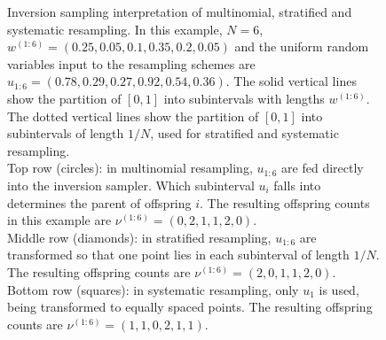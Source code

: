 \begin{figure}
\caption[Inversion sampling for multinomial, stratified and systematic resampling]{Inversion sampling interpretation of multinomial, stratified and systematic resampling.
In this example, $N=6$, $w^{(1:6)} = (0.25,0.05,0.1,0.35,0.2,0.05)$ and the uniform random variables input to the resampling schemes are $u_{1:6} = (0.78, 0.29, 0.27, 0.92, 0.54, 0.36)$.
The solid vertical lines show the partition of $[0,1]$ into subintervals with lengths $w^{(1:6)}$.
The dotted vertical lines show the partition of $[0,1]$ into subintervals of length $1/N$, used for stratified and systematic resampling.\\
Top row (circles): in multinomial resampling, $u_{1:6}$ are fed directly into the inversion sampler. Which subinterval $u_i$ falls into determines the parent of offspring $i$. The resulting offspring counts in this example are $\nu^{(1:6)} = (0,2,1,1,2,0)$.\\
Middle row (diamonds): in stratified resampling, $u_{1:6}$ are transformed so that one point lies in each subinterval of length $1/N$. The resulting offspring counts are $\nu^{(1:6)} = (2,0,1,1,2,0)$.\\
Bottom row (squares): in systematic resampling, only $u_1$ is used, being transformed to equally spaced points. The resulting offspring counts are $\nu^{(1:6)} = (1,1,0,2,1,1)$.}
\label{fig:inv_resampling}
\end{figure}
